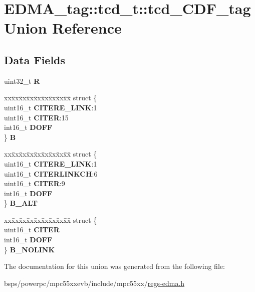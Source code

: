 \hypertarget{unionEDMA__tag_1_1tcd__t_1_1tcd__CDF__tag}{}\section{E\+D\+M\+A\+\_\+tag\+::tcd\+\_\+t\+::tcd\+\_\+\+C\+D\+F\+\_\+tag Union Reference}
\label{unionEDMA__tag_1_1tcd__t_1_1tcd__CDF__tag}
\subsection*{Data Fields}
\begin{DoxyCompactItemize}
\item 
\mbox{\label{unionEDMA__tag_1_1tcd__t_1_1tcd__CDF__tag_aa3f736f19968b0c579200efa68261a94}} 
uint32\+\_\+t {\bfseries R}
\item 
\mbox{\label{unionEDMA__tag_1_1tcd__t_1_1tcd__CDF__tag_afa60273a2fea6a8c9fcbd891e2b21d9c}} 
\begin{tabbing}
xx\=xx\=xx\=xx\=xx\=xx\=xx\=xx\=xx\=\kill
struct \{\\
\>uint16\_t {\bfseries CITERE\_LINK}:1\\
\>uint16\_t {\bfseries CITER}:15\\
\>int16\_t {\bfseries DOFF}\\
\} {\bfseries B}\\

\end{tabbing}\item 
\mbox{\label{unionEDMA__tag_1_1tcd__t_1_1tcd__CDF__tag_abc41894ce2b0aaf7ddc84abb77841792}} 
\begin{tabbing}
xx\=xx\=xx\=xx\=xx\=xx\=xx\=xx\=xx\=\kill
struct \{\\
\>uint16\_t {\bfseries CITERE\_LINK}:1\\
\>uint16\_t {\bfseries CITERLINKCH}:6\\
\>uint16\_t {\bfseries CITER}:9\\
\>int16\_t {\bfseries DOFF}\\
\} {\bfseries B\_ALT}\\

\end{tabbing}\item 
\mbox{\label{unionEDMA__tag_1_1tcd__t_1_1tcd__CDF__tag_a3563737712e7d88a4f3dde91412d7fb6}} 
\begin{tabbing}
xx\=xx\=xx\=xx\=xx\=xx\=xx\=xx\=xx\=\kill
struct \{\\
\>uint16\_t {\bfseries CITER}\\
\>int16\_t {\bfseries DOFF}\\
\} {\bfseries B\_NOLINK}\\

\end{tabbing}\end{DoxyCompactItemize}


The documentation for this union was generated from the following file\+:\begin{DoxyCompactItemize}
\item 
bsps/powerpc/mpc55xxevb/include/mpc55xx/\mbox{\hyperlink{regs-edma_8h}{regs-\/edma.\+h}}\end{DoxyCompactItemize}
